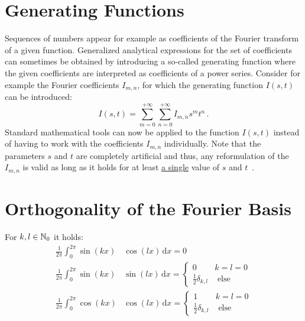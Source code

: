 \FloatBarrier
\section{Generating Functions}
Sequences of numbers appear for example as coefficients of the Fourier transform of a given function.
Generalized analytical expressions for the set of coefficients can sometimes be obtained
by introducing a so-called generating function where the given coefficients
are interpreted as coefficients of a power series.
Consider for example the Fourier coefficients $I_{m,n}$,
for which the generating function $I(s,t)$ can be introduced:
\begin{equation}
  I(s,t) = \sum_{m=0}^{+\infty} \sum_{n=0}^{+\infty} I_{m,n} s^m t^n \, .
\end{equation}
Standard mathematical tools can now be applied to the function $I(s,t)$
instead of having to work with the coefficients $I_{m,n}$ individually.
Note that the parameters $s$ and $t$ are completely artificial and thus,
any reformulation of the $I_{m,n}$ is valid as long as it holds for
at least \underline{a single} value of $s$ and $t$~\cite{discrete_mathematics}.

\FloatBarrier
\section{Orthogonality of the Fourier Basis}
For $k,l \in \mathbb{N}_0$ it holds:
\begin{align}
  \frac{1}{2 \pi} \int_{0}^{2 \pi} \sin(k x) & \cos(l x) \,\mathrm{d}x = 0 \nonumber \\
  \frac{1}{2 \pi} \int_{0}^{2 \pi} \sin(k x) & \sin(l x) \,\mathrm{d}x = \begin{cases}
                                                                           0                         & k=l=0 \\
                                                                           \frac{1}{2} \delta_{k, l} & \textrm{ else}
                                                                         \end{cases}   \label{eqn:ortho_fourier_basis}\\
  \frac{1}{2 \pi} \int_{0}^{2 \pi} \cos(k x) & \cos(l x) \,\mathrm{d}x = \begin{cases}
                                                                           1                         & k=l=0 \\
                                                                           \frac{1}{2} \delta_{k, l} & \textrm{ else}
                                                                         \end{cases} \nonumber
\end{align}

